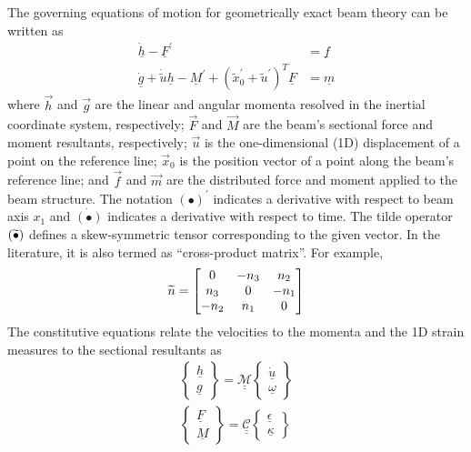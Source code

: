  The governing equations of motion for geometrically exact beam theory can be written as \cite{Bauchau:2010}
\begin{align}
	\label{GovernGEBT-1}
	\dot{\underline{h}} - \underline{F}^\prime &= \underline{f} \\
	\label{GovernGEBT-2}
	\dot{\underline{g}} + \dot{\tilde{u}} \underline{h} - \underline{M}^\prime + (\tilde{x}_0^\prime + \tilde{u}^\prime)^T \underline{F} &= \underline{m}
\end{align}
where $\vec{h}$ and $\vec{g}$ are the linear and angular momenta resolved in the inertial coordinate system, respectively; $\vec{F}$ and $\vec{M}$ are the beam's sectional force and moment resultants, respectively; $\vec{u}$ is the one-dimensional (1D) displacement of a point on the reference line; $\vec{x}_0$ is the position vector of a point along the beam's reference line;  and $\vec{f}$ and $\vec{m}$ are the distributed force and moment applied to the beam structure.  
The notation $(\bullet)^\prime$ indicates a derivative with respect to beam axis $x_1$ and $\dot{(\bullet)}$ indicates a derivative with respect to time. 
The tilde operator $(\widetilde{\bullet})$ defines a skew-symmetric tensor corresponding to the given vector. 
In the literature, it is also termed as ``cross-product matrix''.
For example,
\[
	\widetilde{n} = 
	     		\begin{bmatrix}
			0 & -n_3 & n_2 \\
			n_3 & 0 & -n_1 \\
			-n_2 & n_1 & 0\\
			\end{bmatrix}	
\]
The constitutive equations relate the velocities to the momenta and the 1D strain measures to the sectional resultants as
\begin{align}
	\label{ConstitutiveMass}
	\begin{Bmatrix}
	\underline{h} \\
	\underline{g}
	\end{Bmatrix}
	= \underline{\underline{\mathcal{M}}} \begin{Bmatrix}
	\dot{\underline{u}} \\
	\underline{\omega}
	\end{Bmatrix} \\
	\label{ConstitutiveStiff}
	\begin{Bmatrix}
	\underline{F} \\
	\underline{M}
	\end{Bmatrix}
	= \underline{\underline{\mathcal{C}}} \begin{Bmatrix}
	\underline{\epsilon} \\
	\underline{\kappa}
	\end{Bmatrix}
\end{align}

